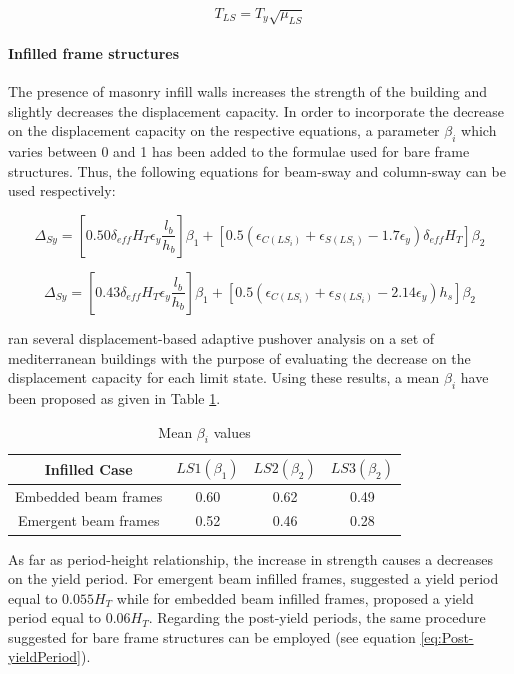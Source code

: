 \begin{equation}
T_{LS}=T_y\sqrt{\mu_{LS}}
\label{eq:Post-yieldPeriod}
\end{equation}

\paragraph{Infilled frame structures}
 
The presence of masonry infill walls increases the strength of the building and slightly decreases the displacement capacity. In order to incorporate the decrease on the displacement capacity on the respective equations, a parameter $\beta_{i}$ which varies between 0 and 1 has been added to the formulae used for bare frame structures. Thus, the following equations for beam-sway and column-sway can be used respectively:

\begin{equation}
\Delta_{Sy}=\left[0.50\delta_{eff}H_T\epsilon_y\frac{l_b}{h_b}\right]\beta_1+\left[0.5(\epsilon_{C\left({LS_i}\right)}+\epsilon_{S\left({LS_i}\right)}-1.7\epsilon_y)\delta_{eff}H_T\right]\beta_2
\end{equation}

\begin{equation}
\Delta_{Sy}=\left[0.43\delta_{eff}H_T\epsilon_y\frac{l_b}{h_b}\right]\beta_1+\left[0.5(\epsilon_{C\left({LS_i}\right)}+\epsilon_{S\left({LS_i}\right)}-2.14\epsilon_y)h_s\right]\beta_2
\end{equation}

\citet{Baletal2010} ran several displacement-based adaptive pushover analysis on a set of mediterranean buildings with the purpose of evaluating the decrease on the displacement capacity for each limit state. Using these results, a mean $\beta_{i}$ have been proposed as given in Table  \ref{table:MeanBeta}.

\begin{table}[ht]
\caption{Mean $\beta_i$ values}
\centering
\begin{tabular}[ht]{cccc}
Infilled Case & $LS1(\beta_1)$ & $LS2(\beta_2)$ & $LS3(\beta_2)$ \\[0.5ex]\hline
Embedded beam frames & 0.60 & 0.62 & 0.49\\
Emergent beam frames & 0.52 & 0.46 & 0.28\\
\end{tabular}
\label{table:MeanBeta}
\end{table}

As far as period-height relationship, the increase in strength causes a decreases on the yield period. For emergent beam infilled frames, \citet{CrowleyPinho2006} suggested a yield period equal to $0.055H_T$ while for embedded beam infilled frames, \citet{Kumar2008} proposed a yield period equal to $0.06H_T$. Regarding the post-yield periods, the same procedure suggested for bare frame structures can be employed (see equation \ref{eq:Post-yieldPeriod}).

